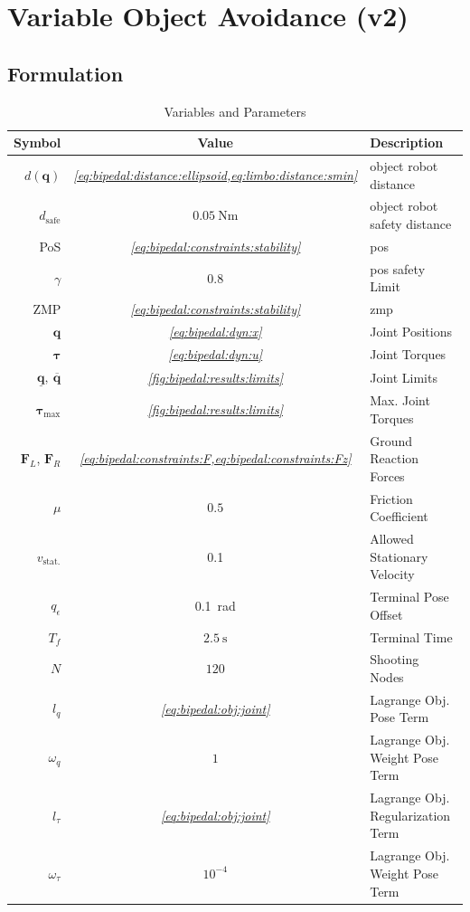 \section{Variable Object Avoidance (v2)} \label{sec:bipedal}

\subsection{Formulation}
\begin{table}
  \centering
  \begin{tabularx}{0.7\textwidth}{rcl}
  \toprule
    Symbol & Value & \multicolumn{1}{X}{Description} \\
  \midrule
    $d(\bm q)$ & \textit{\cref{eq:bipedal:distance:ellipsoid,eq:limbo:distance:smin}} & object robot distance \\
    $d_\text{safe}$ & $\SI{0.05}{\newton\metre}$ & object robot safety distance \\
  \midrule
  PoS & \textit{\cref{eq:bipedal:constraints:stability}} & \acrlong{pos} \\
    $\gamma$ & $0.8$ & \acrshort{pos} safety Limit \\
    ZMP & \textit{\cref{eq:bipedal:constraints:stability}} & \acrlong{zmp} \\
  \midrule
    $\bm q$ & \textit{\cref{eq:bipedal:dyn:x}} & Joint Positions \\
  $\bm{\tau}$ & \textit{\cref{eq:bipedal:dyn:u}} & Joint Torques \\
    \midrule
  $\bm{\underline q},\ \bm{\overline q}$ & \textit{\cref{fig:bipedal:results:limits}} & Joint Limits \\
    $\bm{\tau}_{\text{max}}$ & \textit{\cref{fig:bipedal:results:limits}} & Max. Joint Torques \\
  \midrule
  $\bm F_L$, $\bm F_R$ & \textit{\cref{eq:bipedal:constraints:F,eq:bipedal:constraints:Fz}} & Ground Reaction Forces \\
    $\mu$ & $0.5$ & Friction Coefficient \\
  \midrule
    $v_{\text{stat.}}$ & \SI{0.1}{\frac{\metre}{\second}} & Allowed Stationary Velocity \\
    $q_\epsilon$ & \SI{0.1}{\radian} & Terminal Pose Offset \\
  \midrule
    $T_f$ & $\SI{2.5}{\second}$ & Terminal Time \\
    $N$ & $120$ & Shooting Nodes \\
    $l_q$ & \textit{\cref{eq:bipedal:obj:joint}} & Lagrange Obj. Pose Term \\
    $\omega_q$ & $1$ & Lagrange Obj. Weight Pose Term \\
    $l_\tau$ & \textit{\cref{eq:bipedal:obj:joint}} & Lagrange Obj. Regularization Term \\
    $\omega_\tau$ & $10^{-4}$ & Lagrange Obj. Weight Pose Term \\
  \bottomrule
  \end{tabularx}
  \caption{Variables and Parameters}
  \label{tab:bipedal:variables}
\end{table}

